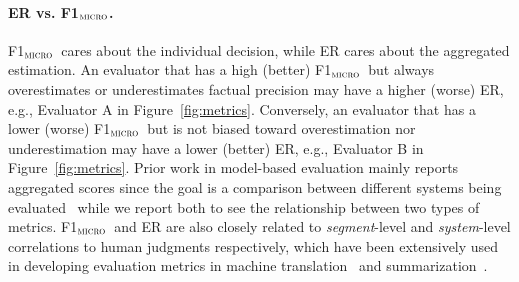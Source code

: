 \documentclass[11pt]{article}
\newcommand{\Fone}{F1$_\textsc{micro}$}
\begin{document}
\paragraph{ER vs. \Fone.}
\Fone\ cares about the individual decision, while ER cares about the aggregated estimation.
An evaluator that has a high (better) \Fone\ but always overestimates or underestimates factual precision may have a higher (worse) ER, e.g., Evaluator A in Figure~\ref{fig:metrics}.
Conversely, an evaluator that has a lower (worse) \Fone\ but is not biased toward overestimation nor underestimation may have a lower (better) ER, e.g., Evaluator B in Figure~\ref{fig:metrics}.
Prior work in model-based evaluation mainly reports aggregated scores since the goal is a comparison between different systems being evaluated~\citep{zhang2019bertscore,rashkin2021measuring,gao2022attributed} while we report both to see the relationship between two types of metrics. 
\Fone\ and ER are also closely related to  \emph{segment}-level and \emph{system}-level correlations to human judgments respectively, which have been extensively used in developing evaluation metrics in machine translation~\citep{ma-etal-2019-results,thompson-post-2020-automatic} and summarization~\citep{bhandari-etal-2020-evaluating,deutsch2021towards}.
\end{document}
